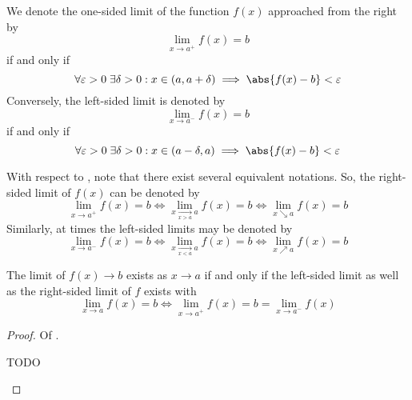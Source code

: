 \begin{definition}\label{def-one-sided-limits}
    We denote the one-sided limit of the function $f(x)$ approached from the right by
    \begin{equation*}
        \lim_{x \to a^+}f(x)=b
    \end{equation*}
    if and only if
    \begin{equation}
        \forall\varepsilon>0\;\exists\delta>0:x\in(a,a+\delta)\implies\abs{f(x)-b}<\varepsilon
    \end{equation}
    Conversely, the left-sided limit is denoted by
    \begin{equation*}
        \lim_{x \to a^-}f(x)=b
    \end{equation*}
    if and only if
    \begin{equation}
        \forall\varepsilon>0\;\exists\delta>0:x\in(a-\delta,a)\implies\abs{f(x)-b}<\varepsilon
    \end{equation}
\end{definition}

\begin{rem}\label{rem-one-sided-limits}
    With respect to , note that there exist
    several equivalent notations. So, the right-sided limit of $f(x)$ can be denoted
    by
    \begin{equation*}
        \lim_{x \to a^+}f(x)=b
        \iff
        \lim_{x \underset{x>a}{\to} a}f(x)=b
        \iff
        \lim_{x\searrow  a}f(x)=b
    \end{equation*}
    Similarly, at times the left-sided limits may be denoted by
    \begin{equation*}
        \lim_{x \to a^-}f(x)=b
        \iff
        \lim_{x \underset{x<a}{\to} a}f(x)=b
        \iff
        \lim_{x \nearrow a}f(x)=b
    \end{equation*}
\end{rem}

\begin{thm}\label{thm-limit-exists-one-sided-limits}
    The limit of $f(x) \to b$ exists as $x \to a$ if and only if the left-sided
    limit as well as the right-sided limit of $f$ exists with
    \begin{equation}
        \lim_{x \to a}f(x)=b \iff \lim_{x \to a^+}f(x)=b=\lim_{x \to a^-}f(x)
    \end{equation}
\end{thm}

\begin{proof}
    Of .
    \begin{flushleft}
        TODO
    \end{flushleft}
\end{proof}

